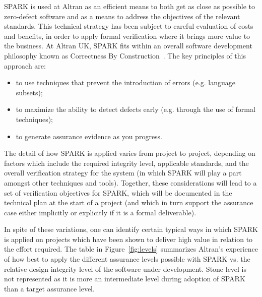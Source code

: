 \documentclass{llncs}
\begin{document}
SPARK is used at Altran as an efficient means to both get as close as possible
to zero-defect software and as a means to address the objectives of the
relevant standards. This technical strategy has been subject to careful
evaluation of costs and benefits, in order to apply formal verification where
it brings more value to the business. At Altran UK, SPARK fits within an
overall software development philosophy known as Correctness By
Construction~\cite{Croxford2005Manifesto}. The key principles of this approach
are:

\begin{itemize}
\item to use techniques that prevent the introduction of errors (e.g. language
  subsets);
\item to maximize the ability to detect defects early (e.g. through the use of
  formal techniques);
\item to generate assurance evidence as you progress.
\end{itemize}

The detail of how SPARK is applied varies from project to project, depending on
factors which include the required integrity level, applicable standards, and
the overall verification strategy for the system (in which SPARK will play a
part amongst other techniques and tools). Together, these considerations will
lead to a set of verification objectives for SPARK, which will be documented in
the technical plan at the start of a project (and which in turn support the
assurance case either implicitly or explicitly if it is a formal deliverable).

In spite of these variations, one can identify certain typical ways in which
SPARK is applied on projects which have been shown to deliver high value in
relation to the effort required. The table in Figure~\ref{fig:levels}
summarizes Altran's experience of how best to apply the different assurance levels
possible with SPARK vs. the relative design integrity level of the software
under development.  Stone level is not represented as it is more an
intermediate level during adoption of SPARK than a target assurance level.
\end{document}
